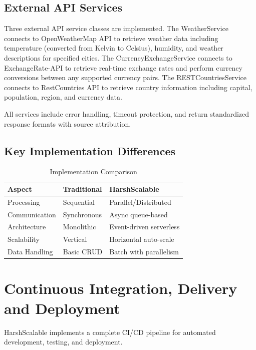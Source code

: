\documentclass[conference]{IEEEtran}
\begin{document}
\subsection{External API Services}

Three external API service classes are implemented. The WeatherService connects to OpenWeatherMap API to retrieve weather data including temperature (converted from Kelvin to Celsius), humidity, and weather descriptions for specified cities. The CurrencyExchangeService connects to ExchangeRate-API to retrieve real-time exchange rates and perform currency conversions between any supported currency pairs. The RESTCountriesService connects to RestCountries API to retrieve country information including capital, population, region, and currency data.

All services include error handling, timeout protection, and return standardized response formats with source attribution.

\subsection{Key Implementation Differences}

\begin{table}[!t]
\caption{Implementation Comparison}
\centering
\small
\begin{tabular}{p{2.5cm}p{2.2cm}p{2.5cm}}
\toprule
\textbf{Aspect} & \textbf{Traditional} & \textbf{HarshScalable} \\
\midrule
Processing & Sequential & Parallel/Distributed \\
Communication & Synchronous & Async queue-based \\
Architecture & Monolithic & Event-driven serverless \\
Scalability & Vertical & Horizontal auto-scale \\
Data Handling & Basic CRUD & Batch with parallelism \\
\bottomrule
\end{tabular}
\end{table}

\section{Continuous Integration, Delivery and Deployment}
\label{sec:cicd}

HarshScalable implements a complete CI/CD pipeline for automated development, testing, and deployment.
\end{document}
